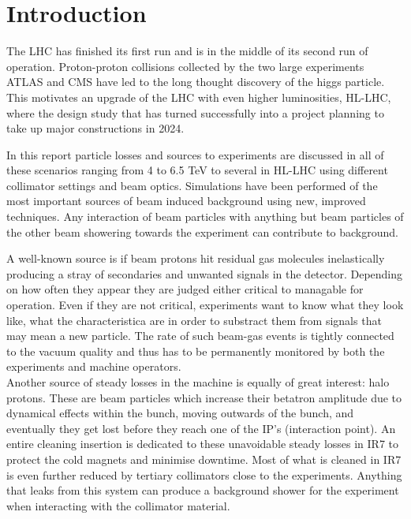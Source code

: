 \section{Introduction}


The LHC has finished its first run and is in the middle of its second run of operation. Proton-proton collisions collected by the two large experiments ATLAS and CMS have led to the long thought discovery of the higgs particle. This motivates an upgrade of the LHC with even higher luminosities, HL-LHC, where the design study that has turned successfully into a project planning to take up major constructions in 2024.

In this report particle losses and sources to experiments are discussed in all of these scenarios ranging from 4 to 6.5 TeV to several in HL-LHC using different collimator settings and beam optics. Simulations have been performed of the most important sources of beam induced background using new, improved techniques. Any interaction of beam particles with anything but beam particles of the other beam showering towards the experiment can contribute to background.

A well-known source is if beam protons hit residual gas molecules inelastically producing a stray of secondaries and unwanted signals in the detector. Depending on how often they appear they are judged either critical to managable for operation. Even if they are not critical, experiments want to know what they look like, what the characteristica are in order to substract them from signals that may mean a new particle. The rate of such beam-gas events is tightly connected to the vacuum quality and thus has to be permanently monitored by both the experiments and machine operators.\\

Another source of steady losses in the machine is equally of great interest: halo protons. These are beam particles which increase their betatron amplitude due to dynamical effects within the bunch, moving outwards of the bunch, and eventually they get lost before they reach one of the IP's (interaction point). An entire cleaning insertion is dedicated to these unavoidable steady losses in IR7 to protect the cold magnets and minimise downtime. Most of what is cleaned in IR7 is even further reduced by tertiary collimators close to the experiments. Anything that leaks from this system can produce a background shower for the experiment when interacting with the collimator material. 

